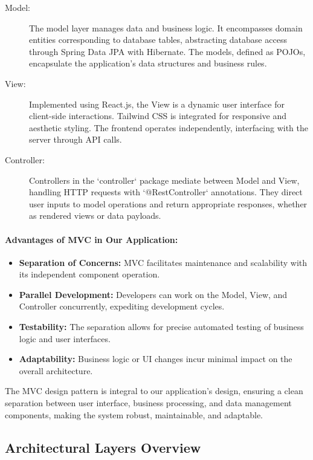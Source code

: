 \begin{description}
  \item[Model:] The model layer manages data and business logic. It encompasses domain entities corresponding to database tables, abstracting database access through Spring Data JPA with Hibernate. The models, defined as POJOs, encapsulate the application's data structures and business rules.
  
  \item[View:] Implemented using React.js, the View is a dynamic user interface for client-side interactions. Tailwind CSS is integrated for responsive and aesthetic styling. The frontend operates independently, interfacing with the server through API calls.
  
  \item[Controller:] Controllers in the `controller` package mediate between Model and View, handling HTTP requests with `@RestController` annotations. They direct user inputs to model operations and return appropriate responses, whether as rendered views or data payloads.
\end{description}
\cite{sandeshMVC2018}

\paragraph{Advantages of MVC in Our Application:}
\begin{itemize}
  \item \textbf{Separation of Concerns:} MVC facilitates maintenance and scalability with its independent component operation.
  \item \textbf{Parallel Development:} Developers can work on the Model, View, and Controller concurrently, expediting development cycles.
  \item \textbf{Testability:} The separation allows for precise automated testing of business logic and user interfaces.
  \item \textbf{Adaptability:} Business logic or UI changes incur minimal impact on the overall architecture.
\end{itemize}

The MVC design pattern is integral to our application's design, ensuring a clean separation between user interface, business processing, and data management components, making the system robust, maintainable, and adaptable.


\subsection{Architectural Layers Overview}

